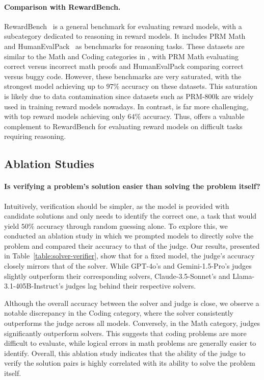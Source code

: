 \documentclass{article} %
\begin{document}
\paragraph{Comparison with RewardBench.} RewardBench~\citep{lambert2024rewardbench} is a general benchmark for evaluating reward models, with a subcategory dedicated to reasoning in reward models. It includes PRM Math~\citep{lightman2023verify} and HumanEvalPack~\citep{muennighoff2023octopack} as benchmarks for reasoning tasks. These datasets are similar to the Math and Coding categories in \sys, with PRM Math evaluating correct versus incorrect math proofs and HumanEvalPack comparing correct versus buggy code. However, these benchmarks are very saturated, with the strongest model achieving up to $97\%$ accuracy on these datasets. This saturation is likely due to data contamination since datasets such as PRM-800k are widely used in training reward models nowadays. In contrast, \sys is far more challenging, with top reward models achieving only $64\%$ accuracy. Thus, \sys offers a valuable complement to RewardBench for evaluating reward models on difficult tasks requiring reasoning.



\subsection{Ablation Studies}
\paragraph{Is verifying a problem's solution easier than solving the problem itself?}
Intuitively, verification should be simpler, as the model is provided with candidate solutions and only needs to identify the correct one, a task that would yield $50\%$ accuracy through random guessing alone. To explore this, we conducted an ablation study in which we prompted models to directly solve the problem and compared their accuracy to that of the judge. Our results, presented in Table~\ref{table:solver-verifier}, show that for a fixed model, the judge's accuracy closely mirrors that of the solver. While GPT-4o's and Gemini-1.5-Pro's judges slightly outperform their corresponding solvers, Claude-3.5-Sonnet's and Llama-3.1-405B-Instruct's judges lag behind their respective solvers.

Although the overall accuracy between the solver and judge is close, we observe a notable discrepancy in the Coding category, where the solver consistently outperforms the judge across all models. Conversely, in the Math category, judges significantly outperform solvers. This suggests that coding problems are more difficult to evaluate, while logical errors in math problems are generally easier to identify. Overall, this ablation study indicates that the ability of the judge to verify the solution pairs is highly correlated with its ability to solve the problem itself. 
\end{document}
